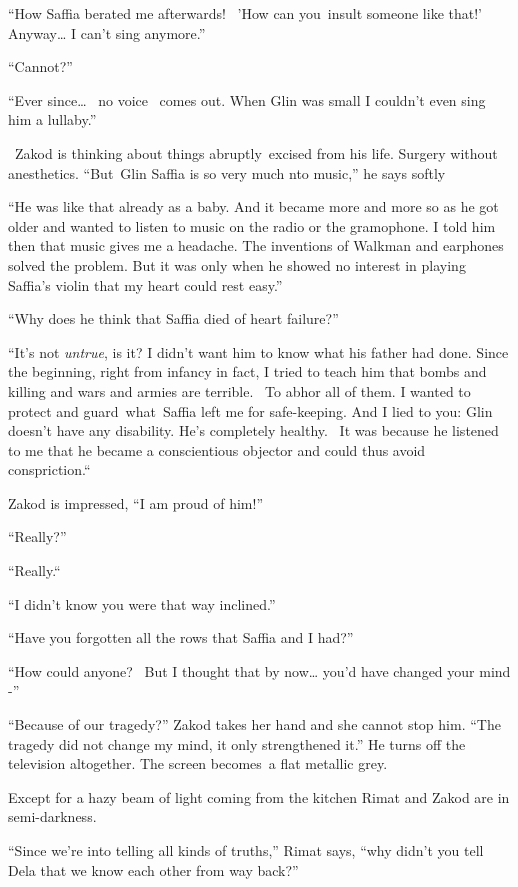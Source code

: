 \documentclass[twoside,11pt]{book}
\begin{document}
``How Saffia berated me afterwards! \ {}'How can you~insult someone like that!' Anyway{\dots} I can't sing
anymore.''

``Cannot?''

``Ever since{\dots} ~no voice ~comes out. When Glin was small I couldn't even sing him a
lullaby.''

~Zakod is thinking about things abruptly~excised from his life. Surgery without anesthetics. ``But~Glin
Saffia is so very much nto music,'' he says softly

``He was like that already as a baby. And it became more and more so as he got older and wanted to listen
to music on the radio or the gramophone. I told him then that music gives me a headache. The inventions of Walkman and
earphones solved the problem. But it was only when he showed no interest in playing Saffia's violin that my heart could
rest easy.''

``Why does he think that Saffia died of heart failure?'' ~

``It's not\textit{ untrue}, is it? I didn't want him to know what his father had done. Since the beginning,
right from infancy in fact, I tried to teach him that bombs and killing and wars and armies are terrible.~ To abhor all
of them. I wanted to protect and guard~what~Saffia left me for safe-keeping. And I lied to you: Glin doesn't have any
disability. He's completely healthy. ~It was because he listened to me that he became a conscientious objector and
could thus avoid conspriction.``{ }

Zakod is impressed, ``I am proud of him!''

``Really?''

``Really.``~

``I didn't know you were that way inclined.''

``Have you forgotten all the rows that Saffia and I had?''

``How could anyone? \ But I thought that by now{\dots} you'd have changed your mind -''

``Because of our tragedy?'' Zakod takes her hand and she cannot stop him. ``The
tragedy did not change my mind, it only strengthened it.'' He turns off the television altogether. The
screen becomes~a flat metallic grey.

Except for a hazy beam of light coming
from the kitchen Rimat and
Zakod are in semi-darkness.

``Since we're into telling all kinds of truths,'' Rimat says, ``why didn't you
tell Dela that we know each other from way back?''
\end{document}
